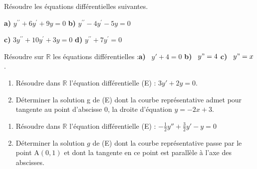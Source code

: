   \begin{exercice} 
  Résoudre les équations différentielles suivantes.

\textbf{a)}\; $y^{\prime\prime } +6y^{\prime}+9y=0 $\hspace*{3cm}
\textbf{b)}\; $y^{\prime\prime } -4y^{\prime} -5y=0 $

\textbf{c)}\; $ 3y^{\prime\prime }+10 y^{\prime} +3y=0  $\hspace*{3cm}
\textbf{d)}\; $ y^{\prime\prime } +7y^{\prime} =0 $

\end{exercice}
  \begin{exercice} 
  Résoudre  sur $ \mathbb{R} $ les équations différentielles  :\;\;\textbf{a)} \, $y'+4=0$  \qquad \textbf{b)} \, $y"=4$ \qquad \textbf{c)} \, $y"=x$.
\end{exercice}
  \begin{exercice} 
  \begin{enumerate}
\item  Résoudre  dans $ \mathbb{R}$ l'équation différentielle (E) \;: $ 3y'+2y=0 $.
\item Déterminer la solution  g de (E)  dont la courbe représentative  admet pour tangente au point d'abscisse $ 0 $, la droite d'équation \; $ y=-2x+3 $.
\end{enumerate}


\end{exercice}

  \begin{exercice} 
  \begin{enumerate}
\item
Résoudre  dans $ \mathbb{R}$ l'équation différentielle (E) \;: $ -\frac{1}{2}y''+\frac{3}{2}y'-y=0 $
\item Déterminer la solution $ g $ de (E)   dont la courbe représentative passe par le point A$ (0,1) $  et   dont la tangente en ce point    est parallèle à l'axe des abscisses.
\end{enumerate}

\end{exercice}

